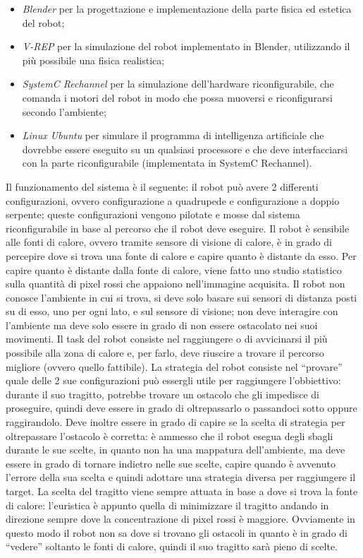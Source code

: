 \documentclass[a4paper,titlepage]{book}
\begin{document}
\begin{itemize}
  \item \textit{Blender} per la progettazione e implementazione della parte fisica ed estetica del robot;
  \item \textit{V-REP} per la simulazione del robot implementato in Blender, utilizzando il più possibile una fisica realistica;
  \item \textit{SystemC Rechannel} per la simulazione dell'hardware riconfigurabile, che comanda i motori del robot in modo che possa muoversi e riconfigurarsi secondo l'ambiente;
  \item \textit{Linux Ubuntu} per simulare il programma di intelligenza artificiale che dovrebbe essere eseguito su un qualsiasi processore e che deve interfacciarsi con la parte riconfigurabile (implementata in SystemC Rechannel).
\end{itemize}

Il funzionamento del sistema è il seguente: il robot può avere 2 differenti configurazioni, ovvero configurazione a quadrupede e configurazione a doppio serpente; queste configurazioni vengono pilotate e mosse dal sistema riconfigurabile in base al percorso che il robot deve eseguire. Il robot è sensibile alle fonti di calore, ovvero tramite sensore di visione di calore, è in grado di percepire dove si trova una fonte di calore e capire quanto è distante da esso. Per capire quanto è distante dalla fonte di calore, viene fatto uno studio statistico sulla quantità di pixel rossi che appaiono nell'immagine acquisita.
Il robot non conosce l'ambiente in cui si trova, si deve solo basare sui sensori di distanza posti su di esso, uno per ogni lato, e sul sensore di visione; non deve interagire con l'ambiente ma deve solo essere in grado di non essere ostacolato nei suoi movimenti. Il task del robot consiste nel raggiungere o di avvicinarsi il più possibile alla zona di calore e, per farlo, deve riuscire a trovare il percorso migliore (ovvero quello fattibile).
La strategia del robot consiste nel ``provare'' quale delle 2 sue configurazioni può essergli utile per raggiungere l'obbiettivo: durante il suo tragitto, potrebbe trovare un ostacolo che gli impedisce di proseguire, quindi deve essere in grado di oltrepassarlo o passandoci sotto oppure raggirandolo. Deve inoltre essere in grado di capire se la scelta di strategia per oltrepassare l'ostacolo è corretta: è ammesso che il robot esegua degli sbagli durante le sue scelte, in quanto non ha una mappatura dell'ambiente, ma deve essere in grado di tornare indietro nelle sue scelte, capire quando è avvenuto l'errore della sua scelta e quindi adottare una strategia diversa per raggiungere il target.
La scelta del tragitto viene sempre attuata in base a dove si trova la fonte di calore: l'euristica è appunto quella di minimizzare il tragitto andando in direzione sempre dove la concentrazione di pixel rossi è maggiore. Ovviamente in questo modo il robot non sa dove si trovano gli ostacoli in quanto è in grado di ``vedere'' soltanto le fonti di calore, quindi il suo tragitto sarà pieno di scelte.
\end{document}
